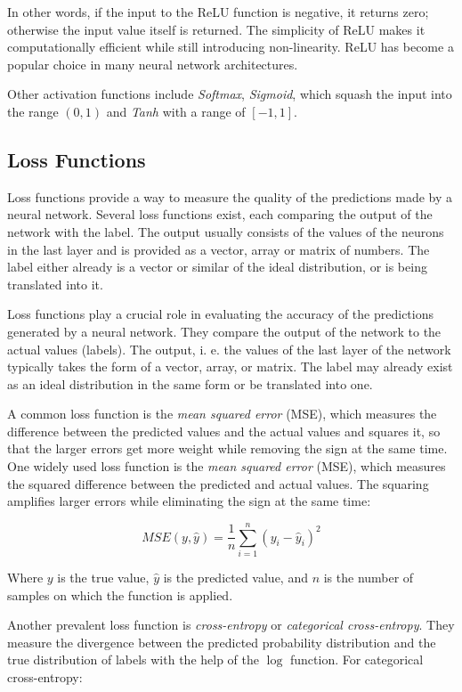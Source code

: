 \documentclass[12pt, a4paper, titlepage]{report}
\begin{document}
In other words, if the input to the ReLU function is negative, it returns zero; otherwise the input value itself is returned. The simplicity of ReLU makes it computationally efficient while still introducing non-linearity. ReLU has become a popular choice in many neural network architectures.

Other activation functions include \emph{Softmax}, \emph{Sigmoid}, which squash the input into the range $(0, 1)$ and \emph{Tanh} with a range of $[-1, 1]$.


\subsection{Loss Functions}

Loss functions provide a way to measure the quality of the predictions made by a neural network. Several loss functions exist, each comparing the output of the network with the label. The output usually consists of the values of the neurons in the last layer and is provided as a vector, array or matrix of numbers. The label either already is a vector or similar of the ideal distribution, or is being translated into it.

Loss functions play a crucial role in evaluating the accuracy of the predictions generated by a neural network. They compare the output of the network to the actual values (labels). The output, i. e. the values of the last layer of the network typically takes the form of a vector, array, or matrix. The label may already exist as an ideal distribution in the same form or be translated into one.


A common loss function is the \emph{mean squared error} (MSE), which measures the difference between the predicted values and the actual values and squares it, so that the larger errors get more weight while removing the sign at the same time.
One widely used loss function is the \emph{mean squared error} (MSE), which measures the squared difference between the predicted and actual values. The squaring amplifies larger errors while eliminating the sign at the same time:

\[
   MSE(y, \hat{y}) = \frac{1}{n} \sum_{i=1}^{n} (y_i - \hat{y}_i)^2
\]

Where $y$ is the true value, $\hat{y}$ is the predicted value, and $n$ is the number of samples on which the function is applied.


Another prevalent loss function is \emph{cross-entropy} or \emph{categorical cross-entropy}. They measure the divergence between the predicted probability distribution and the true distribution of labels with the help of the $\log$ function. For categorical cross-entropy:
\end{document}
